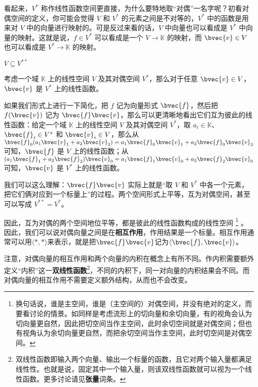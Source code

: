 看起来，$V^*$ 称作线性函数空间更直接，为什么要特地取“对偶”一名字呢？初看对偶空间的定义，你可能会觉得 $V$ 和 $V^*$ 的元素之间是不对等的，$V^*$ 中的函数是用来对 $V$ 中的向量进行映射的。可是反过来看的话，$V$ 中向量也可以看成是 $V^*$ 中向量的映射。这就是说，$f\in V^*$ 可以看成是一个 $V\rightarrow\mathbb{K}$ 的映射，而 $\bvec{v}\in V$ 也可以看成是 $V^*\rightarrow\mathbb{K}$ 的映射。

\begin{theorem}{$V \subseteq V^{**}$}

考虑一个域 $\mathbb{K}$ 上的线性空间 $V$ 及其对偶空间 $V^*$，那么对于任意 $\bvec{v}\in V$，$\bvec{v}$ 是 $V^*$ 上的线性函数。

\end{theorem}

如果我们形式上进行一下简化，把 $f$ 记为向量形式 $\bvec{f}$，然后把 $f(\bvec{v})$ 记为 $\bvec{f}\bvec{v}$，那么可以更清晰地看出它们互为彼此的线性函数：给定一个域 $\mathbb{K}$ 上的线性空间 $V$ 及其对偶空间 $V^*$，取 $a_i\in\mathbb{K}$、$\bvec{f}_i\in V^*$ 和 $\bvec{v}_i\in V$，那么从 $\bvec{f}_0(a_1\bvec{v}_1+a_2\bvec{v}_2)=a_1\bvec{f}_0\bvec{v}_1+a_2\bvec{f}_0\bvec{v}_2$ 可知，$\bvec{f}$ 是 $V$ 上的线性函数；从 $(a_1\bvec{f}_1+a_2\bvec{f}_2)\bvec{v}_0=a_1\bvec{f}_1\bvec{v}_0+a_2\bvec{f}_2\bvec{v}_0$ 可知，$\bvec{v}$ 是 $V^*$ 上的线性函数。

我们可以这么理解：$\bvec{f}\bvec{v}$ 实际上就是“取 $V$ 和 $V^*$ 中各一个元素，把它们俩对应到一个标量上”的过程。两个空间形式上平等，互为对偶空间，甚至可以写成 $V^{**}=V^*$。

因此，互为对偶的两个空间地位平等，都是彼此的线性函数构成的线性空间
\footnote{换句话说，谁是主空间，谁是（主空间的）对偶空间，并没有绝对的定义，而要看讨论的情景。如同样是考虑流形上的切向量和余切向量，有的视角会认为切向量更自然，因此把切空间当作主空间，此时余切空间就是对偶空间；但也有视角认为余切向量更自然，而把余切空间当作主空间，此时切空间是对偶空间。}
。因此，我们可以说对偶向量之间是在\textbf{相互作用}，作用结果是一个标量。相互作用通常可以用$\langle *, * \rangle$来表示，就是把$\bvec{f}\bvec{v}$记为$\langle \bvec{f}, \bvec{v} \rangle$。

注意，对偶向量的相互作用和两个向量的内积在概念上有所不同。作内积需要额外定义“内积”这一\textbf{双线性函数}\footnote{双线性函数即输入两个向量、输出一个标量的函数，且它对两个输入量都满足线性性。也就是说，固定其中一个输入量，则该双线性函数就可以视为一个线性函数。更多讨论请见\textbf{张量}词条。}，不同的内积下，同一对向量的内积结果会不同。而对偶向量的相互作用不需要定义额外结构，从而也不会改变。


